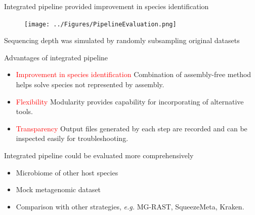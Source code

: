\documentclass{beamer}
\begin{document}
\begin{frame}{Integrated pipeline provided improvement in species identification}
    \begin{figure}
        \texttt{[image: ../Figures/PipelineEvaluation.png]}
    \end{figure}
    Sequencing depth was simulated by \newline randomly subsampling original datasets
\end{frame}

\begin{frame}{Advantages of integrated pipeline}
    \begin{itemize}
        \item \textcolor{red}{Improvement in species identification}
        \newline Combination of assembly-free method helps solve species not represented by assembly.
        \item \textcolor{red}{Flexibility}
        \newline Modularity provides capability for incorporating of alternative tools.
        \item \textcolor{red}{Transparency}
        \newline Output files generated by each step are recorded and can be inspected easily for troubleshooting.
    \end{itemize}
\end{frame}

\begin{frame}{Integrated pipeline could be evaluated more comprehensively}
    \begin{itemize}
        \item Microbiome of other host species
        \item Mock metagenomic dataset
        \item Comparison with other strategies, \textit{e.g.} MG-RAST, SqueezeMeta, Kraken. 
    \end{itemize}
\end{frame}
\end{document}
